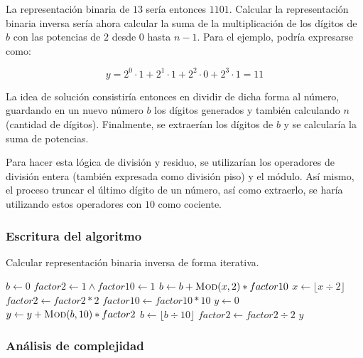\documentclass[letter]{article}
\begin{document}
La representación binaria de $13$ sería entonces $1101$. Calcular la representación binaria inversa sería ahora calcular la suma de la multiplicación de los dígitos de $b$ con las potencias de $2$ desde $0$ hasta $n-1$. Para el ejemplo, podría expresarse como: \par

\[ y = 2^{0} \cdot 1 + 2^{1} \cdot 1 + 2^{2} \cdot 0  + 2^{3} \cdot 1 = 11 \]

La idea de solución consistiría entonces en dividir de dicha forma al número, guardando en un nuevo número $b$ los dígitos generados y también calculando $n$ (cantidad de dígitos). Finalmente, se extraerían los dígitos de $b$ y se calcularía la suma de potencias. \par

Para hacer esta lógica de división y residuo, se utilizarían los operadores de división entera (también expresada como división piso) y el módulo. Así mismo, el proceso truncar el último dígito de un número, así como extraerlo, se haría utilizando estos operadores con $10$ como cociente. \par

\newpage

\subsubsection{Escritura del algoritmo} \label{algoritmos:iterativo:algoritmo}

\begin{algorithm}[!ht]
\caption{Calcular representación binaria inversa de forma iterativa.}
\begin{algorithmic}[1] 
    \State $b \leftarrow 0$
    \State $factor2 \leftarrow 1 \land factor10 \leftarrow 1$
        \State $b \leftarrow b + \Call{Mod}{x, 2} * factor10$
        \State $x \leftarrow \lfloor x \div 2 \rfloor$
        \State $factor2 \leftarrow factor2 * 2$
        \State $factor10 \leftarrow factor10 * 10$
    \EndWhile
    \State $y \leftarrow 0$
        \State $y \leftarrow y + \Call{Mod}{b, 10} * factor2$
        \State $b \leftarrow \lfloor b \div 10 \rfloor$
        \State $factor2 \leftarrow factor2 \div 2$
    \EndWhile
    \State \Return $y$
\EndProcedure
\end{algorithmic}
\end{algorithm}

\subsubsection{Análisis de complejidad} \label{algoritmos:iterativo:complejidad}
\end{document}
